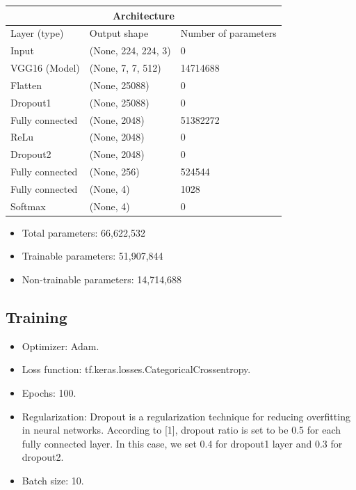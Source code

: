 \documentclass[a4paper,10pt]{article}
\begin{document}
\begin{tabular}{|p{4cm}|p{4cm}|p{4cm}|}
  
  \hline
  \multicolumn{3}{|c|}{Architecture} \\
  \hline
  Layer (type) & Output shape & Number of parameters \\
  \hline
  Input              & (None, 224, 224, 3)& 0 \\
  VGG16 (Model)      & (None, 7, 7, 512)  & 14714688 \\
  Flatten            & (None, 25088)      & 0   \\
  Dropout1            & (None, 25088)      & 0   \\
  Fully connected    & (None, 2048)       & 51382272 \\
  ReLu               & (None, 2048)       & 0 \\
  Dropout2            & (None, 2048)       & 0 \\
  Fully connected    & (None, 256)        & 524544 \\
  Fully connected    & (None, 4)          & 1028\\
  Softmax            & (None, 4)          & 0 \\
  \hline
\end{tabular}

\begin{itemize}
  \item Total parameters: 66,622,532 
  \item Trainable parameters: 51,907,844 
  \item Non-trainable parameters: 14,714,688 
\end{itemize}

\subsection{Training}
\begin{itemize}
  \item Optimizer: Adam.
  \item Loss function: tf.keras.losses.CategoricalCrossentropy.
  \item Epochs: 100.
  \item Regularization: Dropout is a regularization technique 
  for reducing overfitting in neural networks.
  According to [1], dropout ratio is set to be 0.5 for each fully connected layer. 
  In this case, we set 0.4 for dropout1 layer and 0.3 for dropout2.
  \item Batch size: 10. 
\end{itemize}
\end{document}
